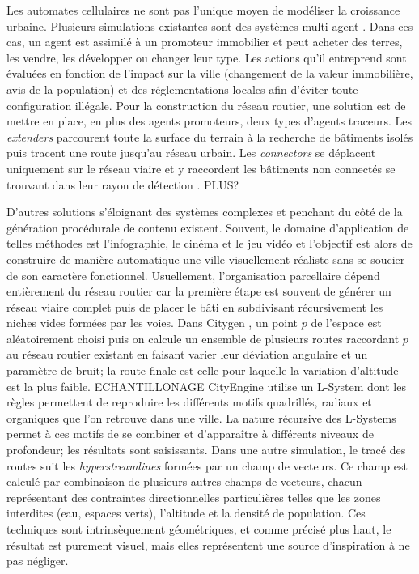 \documentclass[12pt]{article}
\begin{document}
Les automates cellulaires ne sont pas l'unique moyen de modéliser la
croissance urbaine. Plusieurs simulations existantes sont des systèmes
multi-agent \cite{Lechner2003,Lechner2004}. Dans ces cas, un agent est
assimilé à un promoteur immobilier et peut acheter des terres, les
vendre, les développer ou changer leur type. Les actions qu'il
entreprend sont évaluées en fonction de l'impact sur la ville
(changement de la valeur immobilière, avis de la population) et des
réglementations locales afin d'éviter toute configuration illégale.
Pour la construction du réseau routier, une solution est de mettre en
place, en plus des agents promoteurs, deux types d'agents
traceurs. Les \textit{extenders} parcourent toute la surface du
terrain à la recherche de bâtiments isolés puis tracent une route
jusqu'au réseau urbain. Les \textit{connectors} se déplacent
uniquement sur le réseau viaire et y raccordent les bâtiments non
connectés se trouvant dans leur rayon de détection
\cite{Lechnera}. PLUS?

D'autres solutions s'éloignant des systèmes complexes et penchant du
côté de la génération procédurale de contenu existent. Souvent, le
domaine d'application de telles méthodes est l'infographie, le cinéma
et le jeu vidéo et l'objectif est alors de construire de manière
automatique une ville visuellement réaliste sans se soucier de son
caractère fonctionnel. Usuellement, l'organisation parcellaire dépend
entièrement du réseau routier car la première étape est souvent de
générer un réseau viaire complet puis de placer le bâti en subdivisant
récursivement les niches vides formées par les voies. Dans Citygen
\cite{Kelly2006b}, un point $p$ de l'espace est aléatoirement choisi
puis on calcule un ensemble de plusieurs routes raccordant $p$ au
réseau routier existant en faisant varier leur déviation angulaire et
un paramètre de bruit; la route finale est celle pour laquelle la
variation d'altitude est la plus faible. ECHANTILLONAGE CityEngine
\cite{Parish2001} utilise un L-System dont les règles permettent de
reproduire les différents motifs quadrillés, radiaux et organiques que
l'on retrouve dans une ville. La nature récursive des L-Systems permet
à ces motifs de se combiner et d'apparaître à différents niveaux de
profondeur; les résultats sont saisissants. Dans une autre simulation,
le tracé des routes suit les \textit{hyperstreamlines} \cite{Chen2008}
formées par un champ de vecteurs. Ce champ est calculé par combinaison
de plusieurs autres champs de vecteurs, chacun représentant des
contraintes directionnelles particulières telles que les zones
interdites (eau, espaces verts), l'altitude et la densité de
population. Ces techniques sont intrinsèquement géométriques, et comme
précisé plus haut, le résultat est purement visuel, mais elles
représentent une source d'inspiration à ne pas négliger.
\end{document}
